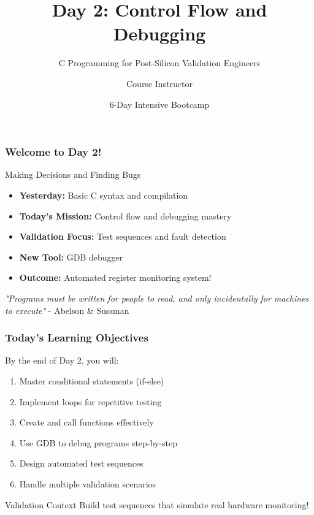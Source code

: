 \documentclass{beamer}
\title{Day 2: Control Flow and Debugging}
\subtitle{C Programming for Post-Silicon Validation Engineers}
\author{Course Instructor}
\date{6-Day Intensive Bootcamp}
\institute{Post-Silicon Validation Training Program}
\begin{document}
\frame{\titlepage}

\begin{frame}
\frametitle{Welcome to Day 2!}
\begin{center}
\Large Making Decisions and Finding Bugs
\end{center}

\begin{itemize}
    \item \textbf{Yesterday:} Basic C syntax and compilation
    \item \textbf{Today's Mission:} Control flow and debugging mastery
    \item \textbf{Validation Focus:} Test sequences and fault detection
    \item \textbf{New Tool:} GDB debugger
    \item \textbf{Outcome:} Automated register monitoring system!
\end{itemize}

\vspace{0.5cm}
\begin{center}
\textit{"Programs must be written for people to read, and only incidentally for machines to execute"} - Abelson \& Sussman
\end{center}
\end{frame}

\begin{frame}
\frametitle{Today's Learning Objectives}
By the end of Day 2, you will:

\begin{enumerate}
    \item Master conditional statements (if-else)
    \item Implement loops for repetitive testing
    \item Create and call functions effectively
    \item Use GDB to debug programs step-by-step
    \item Design automated test sequences
    \item Handle multiple validation scenarios
\end{enumerate}

\vspace{0.5cm}
\begin{alertblock}{Validation Context}
Build test sequences that simulate real hardware monitoring!
\end{alertblock}
\end{frame}
\end{document}
